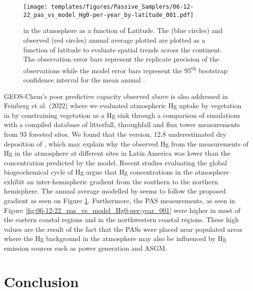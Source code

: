\begin{figure}[H]
  \texttt{[image: templates/figures/Passive\_Samplers/06-12-22\_pas\_vs\_model\_Hg0-per-year\_by-latitude\_001.pdf]}
  \caption{\hg in the atmosphere as a function of Latitude. The \on (blue circles) and observed (red circles) annual average \hg plotted are plotted as a function of latitude to evaluate spatial trends across the continent. The observation error bars represent the replicate precision of the observations while the model error bars represent the 95\textsuperscript{th} bootstrap confidence interval for the mean annual \hg.}
  \label{fig:06-12-22_pas_vs_model_Hg0-per-year_by-latitude_001}
  \centering
  
\end{figure}
\FloatBarrier

\begin{flushleft}
GEOS-Chem's poor predictive capacity observed above is also addressed in Feinberg et al. (2022) where we evaluated atmospheric Hg uptake by vegetation in \gc by constraining vegetation as a Hg sink through a comparison of simulations with a compiled database of litterfall, throughfall and flux tower measurements from 93 forested sites. We found that the \gc version, 12.8  underestimated dry deposition of \hg, which may explain why the observed Hg from the measurements of Hg in the atmosphere at different sites in Latin America was lower than the concentration predicted by the model. Recent studies evaluating the global biogeochemical cycle of Hg argue that Hg concentrations in the atmosphere exhibit an inter-hemispheric gradient from the southern to the northern hemisphere. The annual average \hg modelled by \gc seems to follow the proposed gradient as seen on Figure \ref{fig:06-12-22_pas_vs_model_Hg0-per-year_by-latitude_001}. Furthermore, the PAS measurements, as seen in Figure \ref{fig:06-12-22_pas_vs_model_Hg0-per-year_001} were higher in most of the eastern coastal regions and in the northwestern coastal regions. These high values are the result of the fact that the PASs were placed near populated areas where the Hg background in the atmosphere may also be influenced by Hg emission sources such as power generation and ASGM.

\end{flushleft}











\section{Conclusion}

